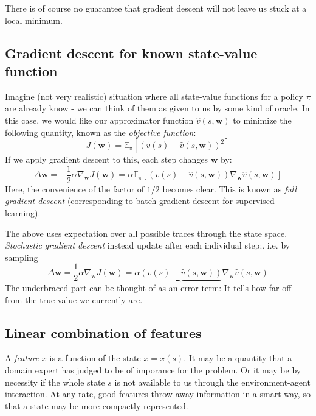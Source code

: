 \documentclass[12pt, a4paper]{article}
\numberwithin{equation}{section}
\begin{document}
There is of course no guarantee that gradient descent will not leave us stuck at a local minimum.

\subsection{Gradient descent for known state-value function}
Imagine (not very realistic) situation where all state-value functions for a policy $\pi$ are already know - we can think of them as given to us by some kind of oracle. In this case, we would like our approximator function $\hat{v}(s,\mathbf{w})$ to minimize the following quantity, known as the \textit{objective function}:
\begin{equation}
J(\mathbf{w})=\mathbb{E}_\pi[(v(s)-\hat{v}(s,\mathbf{w}))^2]
\end{equation}
If we apply gradient descent to this, each step changes $\mathbf{w}$ by:
\begin{equation}
\Delta\mathbf{w}=-\frac{1}{2}\alpha\nabla_\mathbf{w}J(\mathbf{w})=\alpha\mathbb{E}_\pi[(v(s)-\hat{v}(s,\mathbf{w}))\nabla_\mathbf{w}\hat{v}(s,\mathbf{w})]
\end{equation}
Here, the convenience of the factor of $1/2$ becomes clear. This is known as \textit{full gradient descent} (corresponding to batch gradient descent for supervised learning).

The above uses expectation over all possible traces through the state space. \textit{Stochastic gradient descent} instead update after each individual step:. i.e. by sampling
\begin{equation}
\Delta\mathbf{w}=\frac{1}{2}\alpha\nabla_\mathbf{w}J(\mathbf{w})=\alpha\underbrace{(v(s)-\hat{v}(s,\mathbf{w}))}\nabla_\mathbf{w}\hat{v}(s,\mathbf{w})
\label{w_gradient}
\end{equation}
The underbraced part can be thought of as an error term: It tells how far off from the true value we currently are.

\subsection{Linear combination of features}
A \textit{feature} $x$ is a function of the state $x=x(s)$. It may be a quantity that a domain expert has judged to be of imporance for the problem. Or it may be by necessity if the whole state $s$ is not available to us through the environment-agent interaction. At any rate, good features throw away information in a smart way, so that a state may be more compactly represented.
\end{document}
